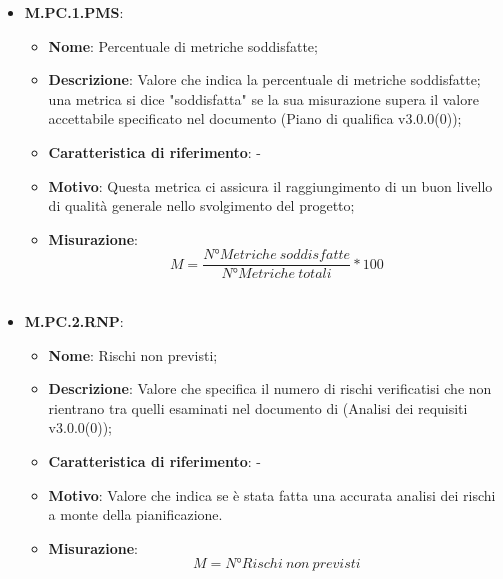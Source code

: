\documentclass[10pt, a4paper]{article}
\begin{document}
\begin{itemize}
    \item \textbf{M.PC.1.PMS}:
    \begin{itemize}
        \item \textbf{Nome}: Percentuale di metriche soddisfatte;
        \item \textbf{Descrizione}: Valore che indica la percentuale di metriche soddisfatte; una metrica si dice "soddisfatta" se la sua misurazione supera il valore accettabile specificato nel documento (Piano di qualifica v3.0.0(0)); 
        \item \textbf{Caratteristica di riferimento}: -
        \item \textbf{Motivo}: Questa metrica ci assicura il raggiungimento di un buon livello di qualità generale nello svolgimento del progetto;
        \item \textbf{Misurazione}: \  \[ M=\frac{N° Metriche \ soddisfatte}{N° Metriche\ totali} * 100 \] \\
    \end{itemize}
  
     \item \textbf{M.PC.2.RNP}:
    \begin{itemize}
        \item \textbf{Nome}: Rischi non previsti;
        \item \textbf{Descrizione}: Valore che specifica il numero di rischi verificatisi che non rientrano tra quelli esaminati nel documento di (Analisi dei requisiti v3.0.0(0));
        \item \textbf{Caratteristica di riferimento}: -
        \item \textbf{Motivo}: Valore che indica se è stata fatta una accurata analisi dei rischi a monte della pianificazione. 
        \item \textbf{Misurazione}:  \[
        M=N°Rischi \ non \ previsti
        \] \\
    \end{itemize}
 


\end{itemize}
\end{document}
